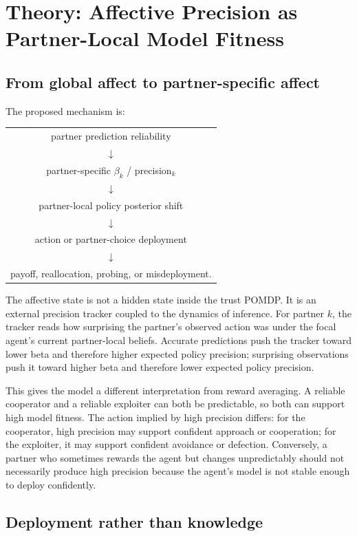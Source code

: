 \section{Theory: Affective Precision as Partner-Local Model Fitness}

\subsection{From global affect to partner-specific affect}

The proposed mechanism is:

\begin{center}
\begin{tabular}{c}
partner prediction reliability \\
$\downarrow$ \\
partner-specific $\beta_k$ / precision$_k$ \\
$\downarrow$ \\
partner-local policy posterior shift \\
$\downarrow$ \\
action or partner-choice deployment \\
$\downarrow$ \\
payoff, reallocation, probing, or misdeployment.
\end{tabular}
\end{center}

The affective state is not a hidden state inside the trust POMDP. It is an external precision tracker coupled to the dynamics of inference. For partner $k$, the tracker reads how surprising the partner's observed action was under the focal agent's current partner-local beliefs. Accurate predictions push the tracker toward lower beta and therefore higher expected policy precision; surprising observations push it toward higher beta and therefore lower expected policy precision.

This gives the model a different interpretation from reward averaging. A reliable cooperator and a reliable exploiter can both be predictable, so both can support high model fitness. The action implied by high precision differs: for the cooperator, high precision may support confident approach or cooperation; for the exploiter, it may support confident avoidance or defection. Conversely, a partner who sometimes rewards the agent but changes unpredictably should not necessarily produce high precision because the agent's model is not stable enough to deploy confidently.

\subsection{Deployment rather than knowledge}

